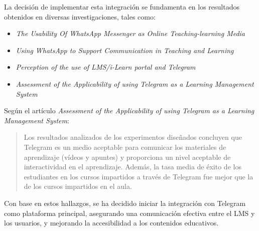 La decisión de implementar esta integración se fundamenta en los resultados
obtenidos en diversas investigaciones, tales como:  

\begin{itemize}  
    \item \textit{The Usability Of WhatsApp Messenger as Online
    Teaching-learning Media} \cite{article:whatsapp_online_teaching_darman}  
    \item \textit{Using WhatsApp to Support Communication in Teaching and
    Learning} \cite{inproceedings:whatsapp_support_teaching_ujakpa}  
    \item \textit{Perception of the use of LMS/i-Learn portal and Telegram}
    \cite{article:perceptions_lms_telegram_hassim}  
    \item \textit{Assessment of the Applicability of using Telegram as a
    Learning Management System} \cite{article:telegram_lms_elebaed}  
\end{itemize}  

Según el artículo \textit{Assessment of the Applicability of using Telegram as a
Learning Management System}:  

\begin{quote}  
Los resultados analizados de los experimentos diseñados concluyen que Telegram
es un medio aceptable para comunicar los materiales de aprendizaje (vídeos y
apuntes) y proporciona un nivel aceptable de interactividad en el aprendizaje.
Además, la tasa media de éxito de los estudiantes en los cursos impartidos a
través de Telegram fue mejor que la de los cursos impartidos en el aula.
\end{quote}  
\cite{article:telegram_lms_elebaed}

Con base en estos hallazgos, se ha decidido iniciar la integración con
Telegram como plataforma principal, asegurando una comunicación
efectiva entre el LMS y los usuarios, y mejorando la accesibilidad a los
contenidos educativos.  
